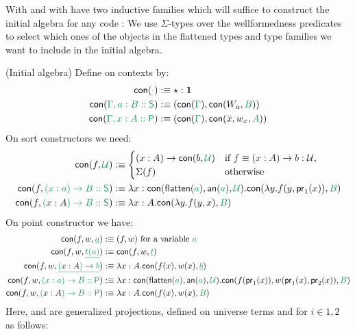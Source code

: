 With \grm{\flatten{\Gamma}} and \grm{\annotate{\Gamma}} with have two inductive
families which will suffice to construct the initial algebra for any code \grm{\Gamma}:
We use $\Sigma$-types over the wellformedness predicates to select which ones of
the objects in the flattened types and type families we want to include in the
initial algebra.

\begin{defn}(Initial algebra)
Define \blm{\con{}} on contexts by:
\begin{align*}
\con{\cdot} &:\equiv \star : \unit \\
\con{\Gamma, a : B :: \Sc} &:\equiv (\con{\Gamma}, \contwo{W_a}{B}) \\
\con{\Gamma, x : A :: \Pc} &:\equiv (\con{\Gamma}, \conthree{\bar{x}}{w_x}{A}) \\
\end{align*}
On sort constructors we need:
\begin{align*}
\contwo{f}{\UU} &:\equiv
\begin{cases}
(x : A) \to \contwo{b}{\UU} & \text{if \blm{f \equiv (x : A) \to b : \UU},} \\
\Sigma(f) & \text{otherwise} %
\end{cases}\\
\contwo{f}{(x : a) \to B :: \Sc} &:\equiv \lambda x : \conthree{\flatten{a}}{\annotate{a}}{\UU}. \contwo{\lambda y. f(y, \pr_1(x))}{B} \\ %
\contwo{f}{(\blm{x : A}) \to B :: \Sc} &:\equiv \lambda x : A. \contwo{\lambda y. f(y, x)}{B}
\end{align*}
On point constructor we have:
\begin{align*}
\conthree{f}{w}{\underline{a}} &:\equiv (f, w) \text{ for a variable \grm{a}} \\
\conthree{f}{w}{\underline{t(u)}} &:\equiv \conthree{f}{w}{\underline{t}} \\
\conthree{f}{w}{\underline{(\blm{x : A}) \to b}} &:\equiv \lambda x : A. \conthree{f(x)}{w(x)}{\underline{b}} \\
\conthree{f}{w}{(x : a) \to B :: \Pc} &:\equiv
\lambda x : \conthree{\flatten{a}}{\annotate{a}}{\UU}. \conthree{f(\pr_1(x))}{w(\pr_1(x), \pr_2(x))}{B} \\ %
\conthree{f}{w}{(\blm{x : A}) \to B :: \Pc} &:\equiv
\lambda x : A. \conthree{f(x)}{w(x)}{B}
\end{align*}
Here,  and  are generalized projections, defined on universe
terms and for $i \in {1, 2}$ as follows:

\end{defn}
